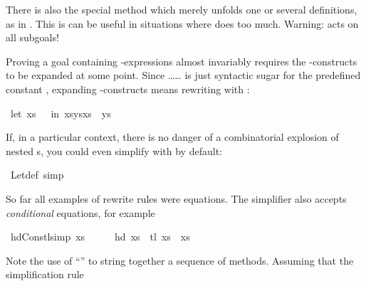 \begin{isabellebody}
\begin{isamarkuptext}
There is also the special method 
which merely unfolds
one or several definitions, as in .
This is can be useful in situations where  does too much.
Warning:  acts on all subgoals!%
\end{isamarkuptext}%
\isamarkuptrue%
%
\isamarkuptrue%
%
\begin{isamarkuptext}%
%
Proving a goal containing -expressions almost invariably requires the
-con\-structs to be expanded at some point. Since
\ldots\isa{=}\ldots{} is just syntactic sugar for
the predefined constant , expanding -constructs
means rewriting with :%
\end{isamarkuptext}%
\isamarkuptrue%
\ {\isachardoublequote}{\isacharparenleft}let\ xs\ {\isacharequal}\ {\isacharbrackleft}{\isacharbrackright}\ in\ xs{\isacharat}ys{\isacharat}xs{\isacharparenright}\ {\isacharequal}\ ys{\isachardoublequote}\isanewline
\isamarkupfalse%
\isamarkupfalse%
\isamarkupfalse%
%
\begin{isamarkuptext}%
If, in a particular context, there is no danger of a combinatorial explosion
of nested s, you could even simplify with  by
default:%
\end{isamarkuptext}%
\isamarkuptrue%
\ Let{\isacharunderscore}def\ {\isacharbrackleft}simp{\isacharbrackright}\isamarkupfalse%
%
\isamarkuptrue%
%
\begin{isamarkuptext}%
%
So far all examples of rewrite rules were equations. The simplifier also
accepts \emph{conditional} equations, for example%
\end{isamarkuptext}%
\isamarkuptrue%
\ hd{\isacharunderscore}Cons{\isacharunderscore}tl{\isacharbrackleft}simp{\isacharbrackright}{\isacharcolon}\ {\isachardoublequote}xs\ {\isasymnoteq}\ {\isacharbrackleft}{\isacharbrackright}\ \ {\isasymLongrightarrow}\ \ hd\ xs\ {\isacharhash}\ tl\ xs\ {\isacharequal}\ xs{\isachardoublequote}\isanewline
\isamarkupfalse%
\isamarkupfalse%
\isamarkupfalse%
%
\begin{isamarkuptext}%
\noindent
Note the use of ``'' to string together a
sequence of methods. Assuming that the simplification rule

\end{isamarkuptext}
\end{isabellebody}
